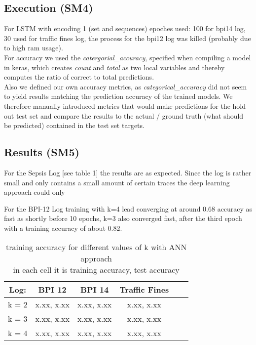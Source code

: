 \documentclass[
	a4paper,
	pagesize,
	pdftex,
	12pt,
	ngerman,
	fleqn,
	final,
	]{scrartcl}
\theoremstyle{plain}
\theoremstyle{definition}
\begin{document}
	\subsection{Execution (SM4)}
	For LSTM with encoding 1 (set and sequences) epoches used: 100 for bpi14 log, 30 used for traffic fines log, the process for the bpi12 log was killed (probably due to high ram usage). \\
	For accuracy we used the \textit{catergorial\_accuracy}, specified when compiling a model in keras, which creates \textit{count} and \textit{total} as two local variables and thereby computes the ratio of correct to total predictions. \\
	Also we defined our own accuracy metrics, as \textit{categorical\_accuracy} did not seem to yield results matching the prediction accuracy of the trained models. We therefore manually introduced metrics that would make predictions for the hold out test set and compare the results to the actual / ground truth (what should be predicted) contained in the test set targets.
	
	\subsection{Results (SM5)}
	For the Sepsis Log [see table 1] the results are as expected. Since the log is rather small and only contains a small amount of certain traces the deep learning approach could only 
	
	For the BPI-12 Log training with k=4 lead converging at around 0.68 accuracy as fast as shortly before 10 epochs, k=3 also converged fast, after the third epoch with a training accuracy of about 0.82.
	
	\begin{table}[h!]
		\centering
		\begin{tabular}{| c | c | c | c | c | c |}
			\hline
			Log:  & BPI 12     & BPI 14     & Traffic Fines \\
			\hline \hline
			k = 2 & x.xx, x.xx & x.xx, x.xx & x.xx, x.xx    \\
			k = 3 & x.xx, x.xx & x.xx, x.xx & x.xx, x.xx    \\
			k = 4 & x.xx, x.xx & x.xx, x.xx & x.xx, x.xx    \\  
			
			\hline
		\end{tabular}
		\caption{training accuracy for different values of k with ANN approach \\
		         in each cell it is training accuracy, test accuracy}
		\label{table:resultsANN}
	\end{table}	 
	
\end{document}

